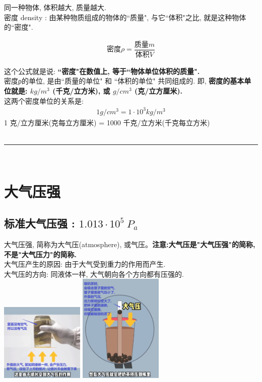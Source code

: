 \documentclass[UTF8]{ctexart}
\begin{document}
	同一种物体, 体积越大, 质量越大. \\
	密度 density : 由某种物质组成的物体的``质量", 与它``体积"之比, 就是这种物体的``密度". 
	
	\begin{align*}
		\boxed{
			\text{密度}\rho =\dfrac{\text{质量}m}{\text{体积}V}
		}
	\end{align*}

	这个公式就是说: \textbf{``密度"在数值上, 等于``物体单位体积的质量".} \\

	密度ρ的单位, 是由``质量的单位" 和 ``体积的单位" 共同组成的. 即, \textbf{密度的基本单位就是: $ kg/m^3$ (千克/立方米), 或 $ g/cm^3$ (克/立方厘米).} \\

	这两个密度单位的关系是: 
	\begin{align*}
		\boxed{			
		1 g / cm^3 = 1 \cdot 10^3 kg/m^3
		}
	\end{align*}
	1 克/立方厘米(克每立方厘米) = 1000 千克/立方米(千克每立方米) \\
	
	
	
	~\\
	\hrule
	~\\
	
	
	
	\section{大气压强}
	
	\subsection{标准大气压强 :  $1.013\cdot 10^5\ P_a$}
	
	大气压强, 简称为大气压(atmosphere), 或气压。\textbf{注意:大气压是"大气压强"的简称,不是"大气压力"的简称.} \\
	
	大气压产生的原因: 由于大气受到重力的作用而产生. \\
	大气压的方向: 同液体一样, 大气朝向各个方向都有压强的. \\
	
	\includegraphics[width=0.3\textwidth]{img/0024.png}
	\includegraphics[width=0.3\textwidth]{img/0025.png}
	
\end{document}
